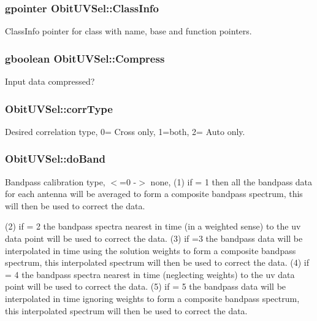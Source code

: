 \subsubsection{\setlength{\rightskip}{0pt plus 5cm}gpointer {\bf Obit\-UVSel::Class\-Info}}\label{structObitUVSel_o1}


Class\-Info pointer for class with name, base and function pointers. 

\subsubsection{\setlength{\rightskip}{0pt plus 5cm}gboolean {\bf Obit\-UVSel::Compress}}\label{structObitUVSel_o21}


Input data compressed? 

\subsubsection{ {\bf Obit\-UVSel::corr\-Type}}\label{structObitUVSel_o41}


Desired correlation type, 0= Cross only, 1=both, 2= Auto only. 

\subsubsection{ {\bf Obit\-UVSel::do\-Band}}\label{structObitUVSel_o39}


Bandpass calibration type, $<$=0 -$>$ none, (1) if = 1 then all the bandpass data for each antenna will be averaged to form a composite bandpass spectrum, this will then be used to correct the data. 

(2) if = 2 the bandpass spectra nearest in time (in a weighted sense) to the uv data point will be used to correct the data. (3) if =3 the bandpass data will be interpolated in time using the solution weights to form a composite bandpass spectrum, this interpolated spectrum will then be used to correct the data. (4) if = 4 the bandpass spectra nearest in time (neglecting weights) to the uv data point will be used to correct the data. (5) if = 5 the bandpass data will be interpolated in time ignoring weights to form a composite bandpass spectrum, this interpolated spectrum will then be used to correct the data. 
